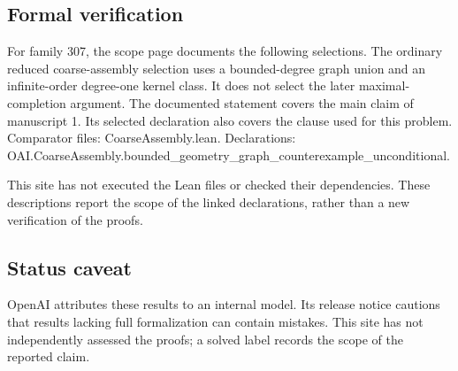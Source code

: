 \documentclass[11pt]{article}
\begin{document}
\subsection{Formal verification}
For family 307, the scope page documents the following selections. The ordinary reduced coarse-assembly selection uses a bounded-degree graph union and an infinite-order degree-one kernel class. It does not select the later maximal-completion argument. The documented statement covers the main claim of manuscript 1. Its selected declaration also covers the clause used for this problem. Comparator files: CoarseAssembly.lean. Declarations: OAI.CoarseAssembly.bounded\_geometry\_graph\_counterexample\_unconditional.

This site has not executed the Lean files or checked their dependencies. These descriptions report the scope of the linked declarations, rather than a new verification of the proofs.

\subsection{Status caveat}
OpenAI attributes these results to an internal model. Its release notice cautions that results lacking full formalization can contain mistakes. This site has not independently assessed the proofs; a solved label records the scope of the reported claim.
\end{document}
